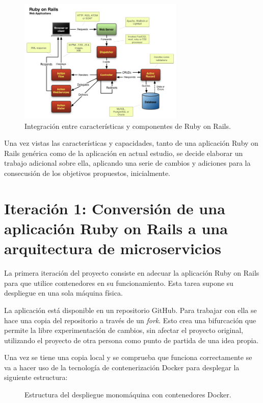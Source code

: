 \begin{figure}[H]
\centering
\includegraphics[width=0.7\textwidth]{images/figures/rubyonrails.png}
\caption{Integración entre características y componentes de Ruby on Rails.\label{fig:figure_placement_example}}
\end{figure}

Una vez vistas las características y capacidades, tanto de una aplicación Ruby on Rails genérica como de la aplicación en actual estudio, se decide elaborar un trabajo adicional sobre ella, aplicando una serie de cambios y adiciones para la consecusión de los objetivos propuestos, inicialmente.

\section{Iteración 1: Conversión de una aplicación Ruby on Rails a una arquitectura de microservicios}

La primera iteración del proyecto consiste en adecuar la aplicación Ruby on Rails para que utilice contenedores en su funcionamiento. Esta tarea supone su despliegue en una sola máquina física.

La aplicación  está disponible en un repositorio GitHub. Para trabajar con ella se hace una copia del repositorio a través de un \textit{fork}. Esto crea una bifurcación que permite la libre experimentación de cambios, sin afectar el proyecto original, utilizando el proyecto de otra persona como punto de partida de una idea propia.

Una vez se tiene una copia local y se comprueba que funciona correctamente se va a hacer uso de la tecnología de contenerización Docker para desplegar la siguiente estructura:

\begin{figure}[H]
\caption{Estructura del despliegue monomáquina con contenedores Docker.\label{fig:figure_docker_microservices}}
\end{figure}

